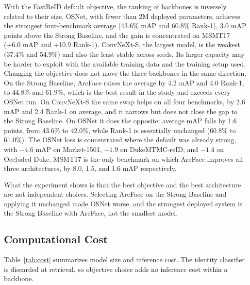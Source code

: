 \documentclass{llncs}
\begin{document}
With the FastReID default objective, the ranking of backbones is inversely related to their size. OSNet, with fewer than 2M deployed parameters, achieves the strongest four-benchmark average (43.6\% mAP and 60.8\% Rank-1), 3.0 mAP points above the Strong Baseline, and the gain is concentrated on MSMT17 (+6.0 mAP and +10.9 Rank-1). ConvNeXt-S, the largest model, is the weakest (37.4\% and 54.9\%) and also the least stable across seeds. Its larger capacity may be harder to exploit with the available training data and the training setup used.
Changing the objective does not move the three backbones in the same direction. On the Strong Baseline, ArcFace raises the average by 4.2 mAP and 4.0 Rank-1, to 44.8\% and 61.9\%, which is the best result in the study and exceeds every OSNet run. On ConvNeXt-S the same swap helps on all four benchmarks, by 2.6 mAP and 2.4 Rank-1 on average, and it narrows but does not close the gap to the Strong Baseline. On OSNet it does the opposite: average mAP falls by 1.6 points, from 43.6\% to 42.0\%, while Rank-1 is essentially unchanged (60.8\% to 61.0\%). The OSNet loss is concentrated where the default was already strong, with $-4.6$ mAP on Market-1501, $-1.9$ on DukeMTMC-reID, and $-1.4$ on Occluded-Duke. MSMT17 is the only benchmark on which ArcFace improves all three architectures, by 8.0, 1.5, and 1.6 mAP respectively.

What the experiment shows is that the best objective and the best architecture are not independent choices. Selecting ArcFace on the Strong Baseline and applying it unchanged made OSNet worse, and the strongest deployed system is the Strong Baseline with ArcFace, not the smallest model.


\subsection{Computational Cost}
\label{sec:efficiency}

Table~\ref{tab:cost} summarizes model size and inference cost. The identity classifier is discarded at retrieval, so objective choice adds no inference cost within a backbone.
\end{document}
